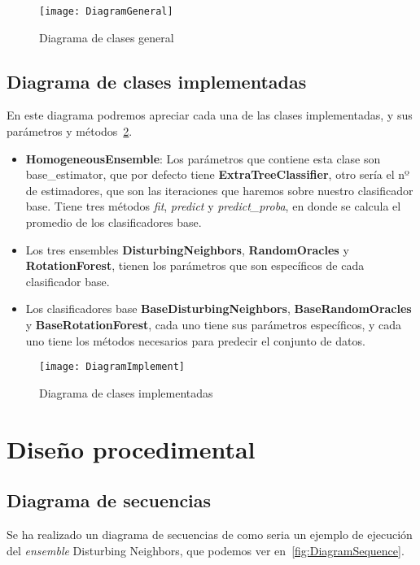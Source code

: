 \begin{figure}
\centering
\texttt{[image: DiagramGeneral]}
\caption{Diagrama de clases general}
\label{fig:DiagramGeneral}
\end{figure}

\subsection{Diagrama de clases implementadas}\label{diagram-implement}
En este diagrama podremos apreciar cada una de las clases implementadas, y sus parámetros y métodos~\ref{fig:DiagramImplement}.
\begin{itemize}	
	\item \textbf{HomogeneousEnsemble}: Los parámetros que contiene esta clase son base\_estimator, que por defecto tiene \textbf{ExtraTreeClassifier}, otro sería el nº de estimadores, que son las iteraciones que haremos sobre nuestro clasificador base. Tiene tres métodos \textit{fit}, \textit{predict} y  \textit{predict\_proba}, en donde se calcula el promedio de los clasificadores base.
	\item Los tres ensembles \textbf{DisturbingNeighbors}, \textbf{RandomOracles} y \textbf{RotationForest}, tienen los parámetros que son específicos de cada clasificador base.
	\item Los clasificadores base \textbf{BaseDisturbingNeighbors}, \textbf{BaseRandomOracles} y \textbf{BaseRotationForest}, cada uno tiene sus parámetros específicos, y cada uno tiene los métodos necesarios para predecir el conjunto de datos.
\end{itemize}

\begin{figure}
\centering
\texttt{[image: DiagramImplement]}
\caption{Diagrama de clases implementadas}
\label{fig:DiagramImplement}
\end{figure}

\section{Diseño procedimental}
\subsection{Diagrama de secuencias}\label{diagrama-secuencias}
Se ha realizado un diagrama de secuencias de como seria un ejemplo de ejecución del \textit{ensemble} Disturbing Neighbors, que podemos ver en~\ref{fig:DiagramSequence}.

